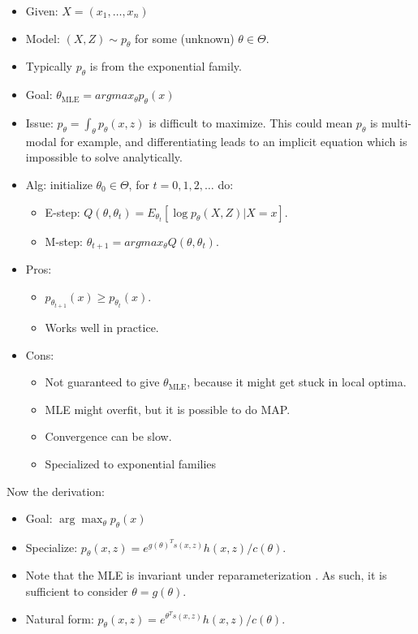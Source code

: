 \begin{itemize}
    \item Given: $X = (x_1, \dots, x_n)$
    \item Model: $(X, Z) \sim p_\theta$ for some (unknown) $\theta \in \Theta$. \item Typically $p_\theta$ is from the exponential family.
    \item Goal: $\theta_{\text{MLE}} = argmax_\theta p_\theta(x)$
    \item Issue: $p_\theta = \int_\theta p_\theta(x,z)$ is difficult to maximize. This could mean $p_\theta$ is multi-modal for example, and differentiating leads to an implicit equation which is impossible to solve analytically.
    \item Alg: initialize $\theta_0 \in \Theta$, for $t = 0,1,2,\dots$ do:
        \begin{itemize}
            \item E-step: $Q(\theta, \theta_t) = E_{\theta_t} [\log p_\theta(X, Z) | X = x]$.
            \item M-step: $\theta_{t+1} = argmax_\theta Q(\theta, \theta_t)$.
        \end{itemize}
        
    \item Pros:
        \begin{itemize}
            \item $p_{\theta_{t+1}}(x) \geq p_{\theta_t}(x)$.
            \item Works well in practice.
        \end{itemize}
    
    \item Cons:
        \begin{itemize}
            \item Not guaranteed to give $\theta_{\text{MLE}}$, because it might get stuck in local optima.
            \item MLE might overfit, but it is possible to do MAP.
            \item Convergence can be slow.
            \item Specialized to exponential families
        \end{itemize}
\end{itemize}

Now the derivation:

\begin{itemize}
    \item Goal: $\arg \max_\theta p_\theta(x)$
    \item Specialize: $p_\theta(x, z) = e^{g(\theta)^T s(x,z)} h(x, z) / c(\theta)$.
    \item Note that the MLE is invariant under reparameterization . As such, it is sufficient to consider $\theta = g(\theta)$.
    \item Natural form: $p_\theta(x, z) = e^{\theta^T s(x,z)} h(x,z) / c(\theta)$.
\end{itemize}

